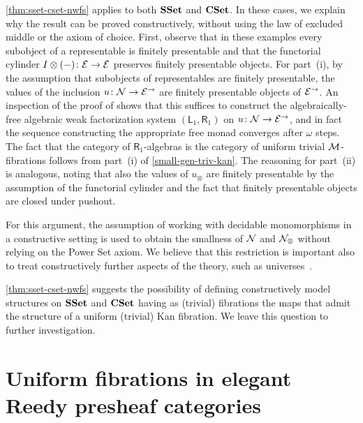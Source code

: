 \documentclass[reqno,10pt,a4paper,oneside,draft]{amsart}
\begin{document}
\begin{remark} \label{rem:constructive-small-object}
\cref{thm:sset-cset-nwfs} applies to both $\SSet$ and $\CSet$.
In these cases, we explain why the result can be proved constructively, \ie without using the law of excluded middle or the axiom of choice.
First, observe that in these examples every subobject of a representable is finitely presentable and that the functorial cylinder $\interval \otimes (-) \co \cal{E} \to \cal{E}$ preserves finitely presentable objects.
For part~(i), by the assumption that subobjects of representables are finitely presentable, the values of the inclusion $u \co \cal{N} \to \cal{E}^\to$ are finitely presentable objects of $\cal{E}^\to$.
An inspection of the proof of \cite[Theorem~4.4]{garner:small-object-argument} shows that this suffices to construct the algebraically-free algebraic weak factorization system $(\mathsf{L}_1, \mathsf{R}_1)$ on $u \co \cal{N} \to \cal{E}^\to$, and in fact the sequence constructing the appropriate free monad converges after $\omega$ steps.
The fact that the category of $\mathsf{R}_1$-algebras is the category of uniform trivial $\cal{M}$-fibrations follows from part~(i) of \cref{small-gen-triv-kan}.
The reasoning for part~(ii) is analogous, noting that also the values of $u_\otimes$ are finitely presentable by the assumption of the functorial cylinder and the fact that finitely presentable objects are closed under pushout.

For this argument, the assumption of working with decidable monomorphisms in a constructive setting is used to obtain the smallness of $\cal{N}$ and $\cal{N}_\otimes$ without relying on the Power Set axiom.
We believe that this restriction is important also to treat constructively further aspects of the theory, such as universes~\cite{cohen-et-al:cubicaltt}.

\cref{thm:sset-cset-nwfs} suggests the possibility of defining constructively model structures on $\SSet$ and $\CSet$ having as (trivial) fibrations the maps that admit the structure of a uniform (trivial) Kan fibration.
We leave this question to further investigation.
\end{remark}

\section{Uniform fibrations in elegant Reedy presheaf categories}
\label{sec:non-alg}
\end{document}
